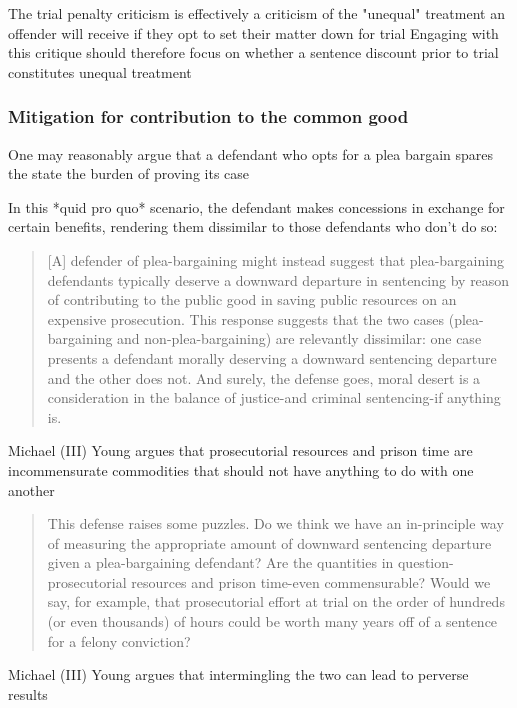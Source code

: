 The trial penalty criticism is effectively a criticism of the "unequal" treatment an offender will receive if they opt to set their matter down for trial
Engaging with this critique should therefore focus on whether a sentence discount prior to trial constitutes unequal treatment

\subsubsection{Mitigation for contribution to the common good}

One may reasonably argue that a defendant who opts for a plea bargain spares the state the burden of proving its case

In this *quid pro quo* scenario, the defendant makes concessions in exchange for certain benefits, rendering them dissimilar to those defendants who don't do so:

\begin{quote}
    [A] defender of plea-bargaining might instead suggest that plea-bargaining defendants typically deserve a downward departure in sentencing by reason of contributing to the public good in saving public resources on an expensive prosecution. This response suggests that the two cases (plea-bargaining and non-plea-bargaining) are relevantly dissimilar: one case presents a defendant morally deserving a downward sentencing departure and the other does not. And surely, the defense goes, moral desert is a consideration in the balance of justice-and criminal sentencing-if anything is.
\end{quote}

Michael (III) Young argues that prosecutorial resources and prison time are incommensurate commodities that should not have anything to do with one another

\begin{quote}
    This defense raises some puzzles. Do we think we have an in-principle way of measuring the appropriate amount of downward sentencing departure given a plea-bargaining defendant? Are the quantities in question-prosecutorial resources and prison time-even commensurable? Would we say, for example, that prosecutorial effort at trial on the order of hundreds (or even thousands) of hours could be worth many years off of a sentence for a felony conviction?
\end{quote}

Michael (III) Young  argues that intermingling the two can lead to perverse results

